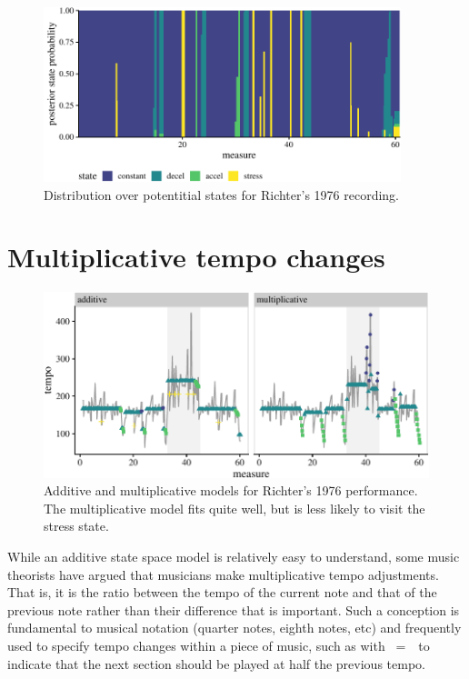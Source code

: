 \documentclass[aoas]{imsart}
\begin{document}
\begin{figure}

{\centering \includegraphics[height=2in]{gfx/posterior-richter-plot-1} 

}

\caption{Distribution over potentitial states for Richter's 1976 recording.}\label{fig:posterior-richter-plot}
\end{figure}

\hypertarget{multiplicative-tempo-changes}{%
\section{Multiplicative tempo
changes}\label{multiplicative-tempo-changes}}

\begin{figure}

{\centering \includegraphics[width=5in]{gfx/multiplicative-model-1} 

}

\caption{Additive and multiplicative models for Richter's 1976 performance. The multiplicative model fits quite well, but is less likely to visit the stress state.}\label{fig:multiplicative-model}
\end{figure}

While an additive state space model is relatively easy to understand,
some music theorists \citep[for example]{Mead2007} have argued that
musicians make multiplicative tempo adjustments. That is, it is the
ratio between the tempo of the current note and that of the previous
note rather than their difference that is important. Such a conception
is fundamental to musical notation (quarter notes, eighth notes, etc)
and frequently used to specify tempo changes within a piece of music,
such as with \halfnote~=~\quarternote~to indicate that the next section
should be played at half the previous tempo.
\end{document}

